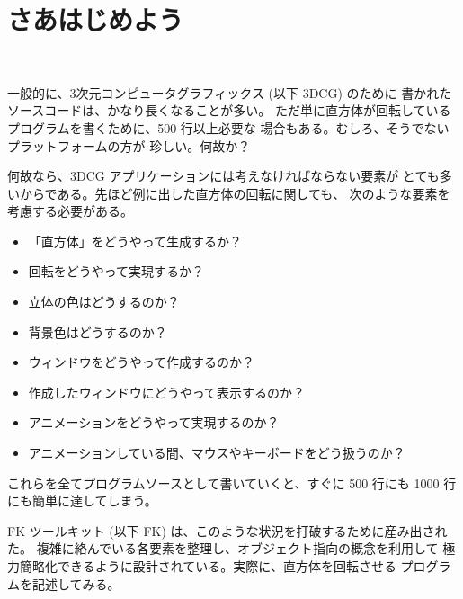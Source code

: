 \chapter{さあはじめよう} \label{chap:intro} ~

一般的に、3次元コンピュータグラフィックス (以下 3DCG) のために
書かれたソースコードは、かなり長くなることが多い。
ただ単に直方体が回転しているプログラムを書くために、500 行以上必要な
場合もある。むしろ、そうでないプラットフォームの方が
珍しい。何故か？

何故なら、3DCG アプリケーションには考えなければならない要素が
とても多いからである。先ほど例に出した直方体の回転に関しても、
次のような要素を考慮する必要がある。
\begin{itemize}
 \item 「直方体」をどうやって生成するか？
 \item 回転をどうやって実現するか？
 \item 立体の色はどうするのか？
 \item 背景色はどうするのか？
 \item ウィンドウをどうやって作成するのか？
 \item 作成したウィンドウにどうやって表示するのか？
 \item アニメーションをどうやって実現するのか？
 \item アニメーションしている間、マウスやキーボードをどう扱うのか？
\end{itemize}
これらを全てプログラムソースとして書いていくと、すぐに 500 行にも
1000 行にも簡単に達してしまう。

FK ツールキット (以下 FK) は、このような状況を打破するために産み出された。
複雑に絡んでいる各要素を整理し、オブジェクト指向の概念を利用して
極力簡略化できるように設計されている。実際に、直方体を回転させる
プログラムを記述してみる。
